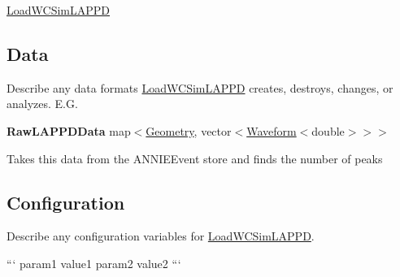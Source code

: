 \hyperlink{classLoadWCSimLAPPD}{Load\-W\-C\-Sim\-L\-A\-P\-P\-D}

\subsection*{Data}

Describe any data formats \hyperlink{classLoadWCSimLAPPD}{Load\-W\-C\-Sim\-L\-A\-P\-P\-D} creates, destroys, changes, or analyzes. E.\-G.

{\bfseries Raw\-L\-A\-P\-P\-D\-Data} {\ttfamily map$<$\hyperlink{classGeometry}{Geometry}, vector$<$\hyperlink{classWaveform}{Waveform}$<$double$>$$>$$>$}
\begin{DoxyItemize}
\item Takes this data from the {\ttfamily A\-N\-N\-I\-E\-Event} store and finds the number of peaks
\end{DoxyItemize}

\subsection*{Configuration}

Describe any configuration variables for \hyperlink{classLoadWCSimLAPPD}{Load\-W\-C\-Sim\-L\-A\-P\-P\-D}.

``` param1 value1 param2 value2 ``` 